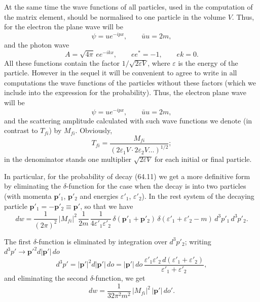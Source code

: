 At the same time the wave functions of all particles, used in the computation of the matrix element, should be normalised to one particle in the volume $V$. Thus, for the electron the plane wave will be
\begin{equation}
\psi = ue^{-ipx},\qquad \bar{u}u = 2m,
\tag{64.8}
\end{equation}
and the photon wave
\begin{equation}
A = \sqrt{4\pi}\,ee^{-ikx},\qquad ee^* = -1,\qquad ek = 0.
\tag{64.9}
\end{equation}
All these functions contain the factor $1/\sqrt{2\varepsilon V}$, where $\varepsilon$ is the energy of the particle. However in the sequel it will be convenient to agree to write in all computations the wave functions of the particles without these factors (which we include into the expression for the probability). Thus, the electron plane wave will be
\[
\psi = ue^{-ipx},\qquad \bar{u}u = 2m,
\]
and the scattering amplitude calculated with such wave functions we denote (in contrast to $T_{fi}$) by $M_{fi}$. Obviously,
\begin{equation}
T_{fi} = \frac{M_{fi}}{(2\varepsilon_1 V\cdot 2\varepsilon_2 V\ldots)^{1/2}};
\tag{64.10}
\end{equation}
in the denominator stands one multiplier $\sqrt{2\varepsilon V}$ for each initial or final particle.

In particular, for the probability of decay (64.11) we get a more definitive form by eliminating the $\delta$-function for the case when the decay is into two particles (with momenta $\mathbf{p}'_1$, $\mathbf{p}'_2$ and energies $\varepsilon'_1$, $\varepsilon'_2$). In the rest system of the decaying particle $\mathbf{p}'_1 = -\mathbf{p}'_2 \equiv \mathbf{p}'$, so that we have
\[
dw = \frac{1}{(2\pi)^2}\,|M_{fi}|^2\,\frac{1}{2m}\,\frac{1}{4\varepsilon'_1\varepsilon'_2}\,\delta(\mathbf{p}'_1 + \mathbf{p}'_2)\,\delta(\varepsilon'_1 + \varepsilon'_2 - m)\,d^3p'_1\,d^3p'_2.
\]

The first $\delta$-function is eliminated by integration over $d^3p'_2$; writing $d^3p' \to \mathbf{p}'^2 d|\mathbf{p}'|\,do$
\begin{equation}
d^3p' = |\mathbf{p}'|^2 d|\mathbf{p}'|\,do = |\mathbf{p}'|\,do\,\frac{\varepsilon'_1\varepsilon'_2\,d(\varepsilon'_1 + \varepsilon'_2)}{\varepsilon'_1 + \varepsilon'_2},
\tag{64.12}
\end{equation}
and eliminating the second $\delta$-function, we get
\begin{equation}
dw = \frac{1}{32\pi^2 m^2}\,|M_{fi}|^2\,|\mathbf{p}'|\,do'.
\tag{64.13}
\end{equation}

